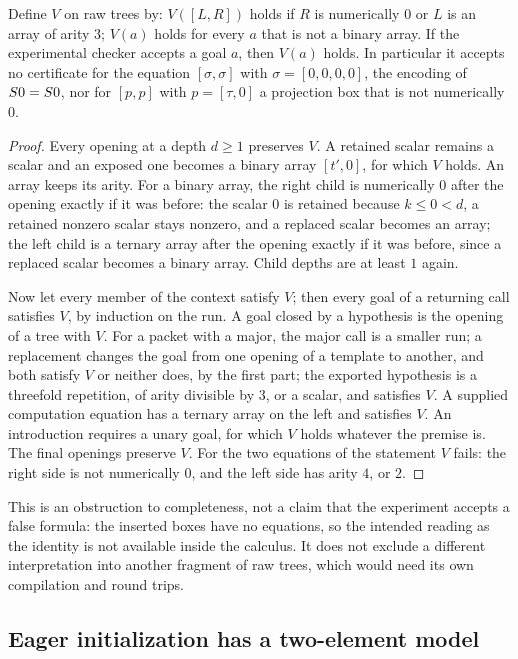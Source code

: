 \begin{proposition}\label{cert:prop:coercion}
Define $V$ on raw trees by: $V([L,R])$ holds if $R$ is numerically $0$ or $L$
is an array of arity $3$; $V(a)$ holds for every $a$ that is not a binary
array. If the experimental checker accepts a goal $a$, then $V(a)$ holds. In
particular it accepts no certificate for the equation $[\sigma,\sigma]$ with
$\sigma=[0,0,0,0]$, the encoding of $S 0=S 0$, nor for $[p,p]$ with
$p=[\tau,0]$ a projection box that is not numerically $0$.
\end{proposition}
\begin{proof}
Every opening at a depth $d\ge 1$ preserves $V$. A retained scalar remains a
scalar and an exposed one becomes a binary array $[t',0]$, for which $V$
holds. An array keeps its arity. For a binary array, the right child is
numerically $0$ after the opening exactly if it was before: the scalar $0$ is
retained because $k\le 0<d$, a retained nonzero scalar stays nonzero, and a
replaced scalar becomes an array; the left child is a ternary array after the
opening exactly if it was before, since a replaced scalar becomes a binary
array. Child depths are at least $1$ again.

Now let every member of the context satisfy $V$; then every goal of a
returning call satisfies $V$, by induction on the run. A goal closed by a
hypothesis is the opening of a tree with $V$. For a packet with a major, the
major call is a smaller run; a replacement changes the goal from one opening
of a template to another, and both satisfy $V$ or neither does, by the first
part; the exported hypothesis is a threefold repetition, of arity divisible
by $3$, or a scalar, and satisfies $V$. A supplied computation equation has a
ternary array on the left and satisfies $V$. An introduction requires a unary
goal, for which $V$ holds whatever the premise is. The final openings
preserve $V$. For the two equations of the statement $V$ fails: the right
side is not numerically $0$, and the left side has arity $4$, or $2$.
\end{proof}

This is an obstruction to completeness, not a claim that the experiment
accepts a false formula: the inserted boxes have no equations, so the
intended reading as the identity is not available inside the calculus. It
does not exclude a different interpretation into another fragment of raw
trees, which would need its own compilation and round trips.

\subsection{Eager initialization has a two-element model}

